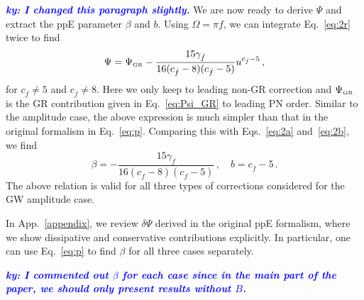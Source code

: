 \documentclass[prd,twocolumn,nofootinbib]{revtex4-1}
\newcommand\be{\begin{equation}}
\newcommand\ee{\end{equation}}
\newcommand{\GR}{{\mbox{\tiny GR}}}
\newcommand{\ky}[1]{\textcolor{blue}{\it{\textbf{ky: #1}}} }
\begin{document}
\ky{I changed this paragraph slightly.}
We are now ready to derive $\Psi$ and extract the ppE parameter $\beta$ and $b$. Using $\Omega = \pi f$, we can integrate Eq.~\eqref{eq:2r} twice to find 
\be
\label{eq:Psi}
\Psi = \Psi_\GR  -\frac{15 \text{$\gamma_{\dot{f}} $}}{16 (\text{$c_{\dot{f}}$}-8) (\text{$c_{\dot{f}}$}-5)} u^{c_{\dot{f}}-5}\,,
\ee
for $c_{\dot{f}} \neq 5$ and $c_{\dot{f}} \neq 8$. Here we only keep to leading non-GR correction and $\Psi_{\GR}$ is the GR contribution given in Eq.~\eqref{eq:Psi_GR} to leading PN order. Similar to the amplitude case, the above expression is much simpler than that in the original formalism in Eq.~\eqref{eq:p}.
Comparing this with Eqs.~\eqref{eq:2a} and~\eqref{eq:2b}, we find
\begin{equation}
\label{eq:2v}
\beta=-\frac{15 \text{$\gamma_{\dot{f}} $}}{16 (\text{$c_{\dot{f}}$}-8) (\text{$c_{\dot{f}}$}-5)}\,, \quad b=c_{\dot{f}}-5\,.
\end{equation}
The above relation is valid for all three types of corrections considered for the GW amplitude case. 

In App.~\ref{appendix}, we review $\delta\Psi$ derived in the original ppE formalism, where we show dissipative and conservative contributions explicitly. In particular, one can use Eq.~\eqref{eq:p} to find $\beta$ for all three cases separately.

\ky{I commented out $\beta$ for each case since in the main part of the paper, we should only present results without $B$.}
\end{document}
